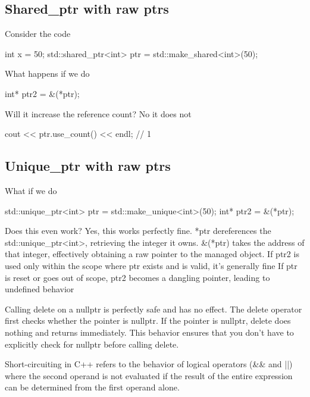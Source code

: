 \documentclass{report}
\begin{document}
    \pagebreak 
    \subsection{Shared\_ptr with raw ptrs}
    \bigbreak \noindent 
    Consider the code
    \bigbreak \noindent 
    \begin{cppcode}
    int x = 50;
    std::shared_ptr<int> ptr = std::make_shared<int>(50);
    \end{cppcode}
    \bigbreak \noindent 
    What happens if we do
    \bigbreak \noindent 
    \begin{cppcode}
        int* ptr2 = &(*ptr);
    \end{cppcode}
    \bigbreak \noindent 
    Will it increase the reference count? No it does not
    \bigbreak \noindent 
    \begin{cppcode}
        cout << ptr.use_count() << endl; // 1
    \end{cppcode}
    \bigbreak \noindent 
    \subsection{Unique\_ptr with raw ptrs}
    \bigbreak \noindent 
    What if we do
    \bigbreak \noindent 
    \begin{cppcode}
        std::unique_ptr<int> ptr = std::make_unique<int>(50);
        int* ptr2 = &(*ptr);
    \end{cppcode}
    \bigbreak \noindent 
    Does this even work? Yes, this works perfectly fine. *ptr dereferences the std::unique\_ptr<int>, retrieving the integer it owns. \&(*ptr) takes the address of that integer, effectively obtaining a raw pointer to the managed object.
    \bigbreak \noindent 
    If ptr2 is used only within the scope where ptr exists and is valid, it's generally fine
    \bigbreak \noindent 
    If ptr is reset or goes out of scope, ptr2 becomes a dangling pointer, leading to undefined behavior

    \pagebreak 
    \bigbreak \noindent 
     Calling delete on a nullptr is perfectly safe and has no effect.
     \bigbreak \noindent 
     The delete operator first checks whether the pointer is nullptr. If the pointer is nullptr, delete does nothing and returns immediately.
     \bigbreak \noindent 
    This behavior ensures that you don’t have to explicitly check for nullptr before calling delete.

    \pagebreak 
    \bigbreak \noindent 
    Short-circuiting in C++ refers to the behavior of logical operators (&& and ||) where the second operand is not evaluated if the result of the entire expression can be determined from the first operand alone.
    \bigbreak \noindent 
\end{document}
